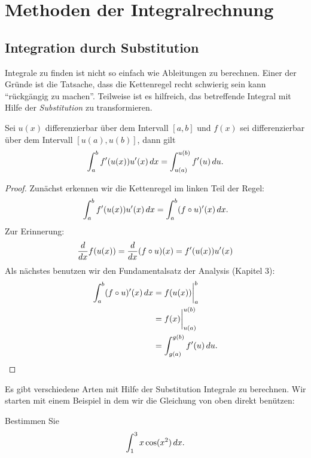 \chapter{Methoden der Integralrechnung}


\section{Integration durch Substitution}

Integrale zu finden ist nicht so einfach wie Ableitungen zu berechnen. Einer der Gründe ist die Tatsache, dass die Kettenregel recht schwierig sein kann ``rückgängig zu machen''. Teilweise ist es hilfreich, das betreffende Integral mit Hilfe der \textit{Substitution} zu transformieren.


\begin{mainTheorem}[Substitutionsregel] 
Sei $u(x)$ differenzierbar über dem Intervall $[a,b]$ und $f(x)$ sei differenzierbar
über dem Intervall $[u(a),u(b)]$, dann gilt
\[
\int_a^b f'(u(x)) u'(x) \, d x =\int_{u(a)}^{u(b)} f'(u) \, d u.
\]
\end{mainTheorem}
\begin{proof} Zunächst erkennen wir die Kettenregel im linken Teil der Regel:
\[
\int_a^b f'(u(x)) u'(x) \, d x = \int_a^b (f\circ u)'(x) \, d x.
\]
Zur Erinnerung:
\[ \frac{d}{dx} f(u(x)) = \frac{d}{dx} (f\circ u)(x) =f'(u(x))u'(x) \]
Als nächstes benutzen wir den Fundamentalsatz der Analysis (Kapitel 3): 
\begin{align*} 
\int_a^b (f\circ u)'(x) \, d x &= f(u(x)) \bigg|_a^b \\
&= f(x) \bigg|_{u(a)}^{u(b)}\\ 
&= \int_{g(a)}^{g(b)} f'(u) \, d u.
\end{align*}
\end{proof}

Es gibt verschiedene Arten mit Hilfe der Substitution Integrale zu berechnen. Wir starten mit einem Beispiel in dem wir die Gleichung von oben direkt benützen:
\begin{example}
Bestimmen Sie
\[
\int_1^3 x\cos(x^2)\, d x.
\]
\end{example}


